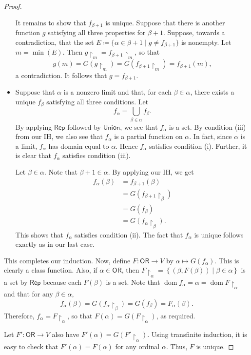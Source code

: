\documentclass[10pt,letterpaper,cm]{nupset}
\theoremstyle{definition}
\theoremstyle{theorem}
\theoremstyle{remark}
\newcommand{\1}{\mathbf{1}}
\newcommand{\0}{\vec 0}
\newcommand{\ord}{\mathsf{OR}}
\DeclareMathOperator{\dom}{dom}
\begin{document}
\begin{proof}
\begin{itemize}
 It remains to show that $f_{\beta +1}$ is unique. Suppose that there is another function $g$ satisfying all three properties for $\beta +1$. Suppose, towards a contradiction, that the set $E\coloneqq \{\alpha  \in \beta +1 \mid g \ne f_{\beta +1}\}$ is nonempty. Let $m = \min(E)$. Then $g\restriction_m = f_{\beta +1}\restriction_m $, so that $$g(m) = G(g\restriction_m)  = G(f_{\beta +1}\restriction_m) = f_{\beta +1}(m),$$ a contradiction. It follows that $g = f_{\beta +1}$.
\item Suppose that $\alpha$ is a nonzero limit and that, for each $\beta \in \alpha$, there exists a unique $f_{\beta}$ satisfying all three conditions. Let $$f_{\alpha} =\bigcup_{\beta \in \alpha} f_{\beta}.$$ By applying $\mathsf{Rep}$ followed by $\mathsf{Union}$, we see that $f_{\alpha}$ is a set. By condition (iii) from our IH, we also see that $f_{\alpha}$ is a partial function on $\alpha$. In fact, since $\alpha$ is a limit, $f_{\alpha}$ has domain equal to $\alpha$. Hence $f_{\alpha}$ satisfies condition (i). Further, it is clear that $f_{\alpha}$ satisfies condition (iii). 

Let $\beta \in \alpha$. Note that $\beta +1 \in \alpha$. By applying our IH, we get
\begin{align*}
f_{\alpha}(\beta) & = f_{\beta +1}(\beta)  
\\ &  = G(f_{\beta +1}\restriction_{\beta}) 
\\ & = G(f_{\beta})  
\\ & = G(f_{\alpha}\restriction_{\beta}).
\end{align*}
This shows that $f_{\alpha}$ satisfies condition (ii). The fact that $f_{\alpha}$ is unique follows exactly as in our last case.
\end{itemize}$ $This completes our induction. Now, define $F: \ord \to V$ by $\alpha \mapsto G(f_{\alpha})$. This is clearly a class function. Also, if $\alpha \in \ord$, then $F\restriction_{\alpha} = \left\{(\beta, F(\beta)) \mid \beta \in \alpha\right\}$ is a set by $\mathsf{Rep}$ because  each $F(\beta)$ is a set. Note that $\dom{f_{\alpha}} = \alpha = \dom{F\restriction_{\alpha}}$ and that for any $\beta \in \alpha$,
$$  f_{\alpha}(\beta) = G(f_{\alpha}\restriction_{\beta}) =  G(f_{\beta})= F_{\alpha}(\beta)  .$$ Therefore, $f_{\alpha} = F\restriction_{\alpha}$, so that $F(\alpha) = G(F\restriction_{\alpha})$, as required. 

\smallskip

Let $F' : \ord \to V$ also have $F'(\alpha) = G({F'\restriction_{\alpha}})$. Using transfinite induction, it is easy to check that $F'(\alpha) = F(\alpha)$ for any ordinal $\alpha$. Thus, $F$ is unique. 
\end{proof}
\end{document}
